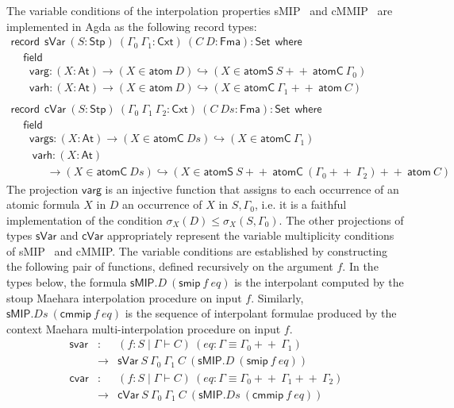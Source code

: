 \documentclass[sn-mathphys-num]{sn-jnl}%
\newcommand{\GG}{\Gamma}
\newcommand{\gs}[1]{\sigma_{X} (#1)}
\newcommand{\sMIP}{\textsf{sMIP}}
\newcommand{\cMMIP}{\textsf{cMMIP}}
\newcommand{\append}{+\!\!+}
\newcommand{\At}{\mathsf{At}}
\newcommand{\Fma}{\mathsf{Fma}}
\newcommand{\where}{\mathsf{where}}
\newcommand{\Set}{\mathsf{Set}}
\newcommand{\record}{\mathsf{record}}
\newcommand{\field}{\mathsf{field}}
\newcommand{\Stp}{\mathsf{Stp}}
\newcommand{\Cxt}{\mathsf{Cxt}}
\theoremstyle{thmstyleone}%
\theoremstyle{thmstyletwo}%
\theoremstyle{thmstylethree}%
\begin{document}
The variable conditions of the interpolation properties \sMIP~ and \cMMIP~ are implemented in Agda as the following record types:
\[
\begin{array}{l}
  \record \:\:  \mathsf{sVar} ~(S : \Stp) ~(\GG_0 ~\GG_1 : \Cxt) ~(C ~D : \Fma) : \Set \:\: \where \\
  \;\;\;\; \field \\
  \;\;\;\; \;\; \mathsf{varg} : (X : \At) \to (X \in \mathsf{atom}~D) \hookrightarrow (X \in \mathsf{atomS} ~S \append ~\mathsf{atomC} ~\Gamma_0) \\
  \;\;\;\; \;\; \mathsf{varh} : (X : \At) \to (X \in \mathsf{atom}~D) \hookrightarrow (X \in \mathsf{atomC} ~\GG_1 \append ~\mathsf{atom} ~C) \\ \\
  \record \:\:  \mathsf{cVar} ~(S : \Stp) ~(\GG_0 ~\GG_1 ~\GG_2: \Cxt) ~(C ~Ds : \Fma) : \Set \:\: \where \\
  \;\;\;\; \field \\
  \;\;\;\; \;\; \mathsf{vargs} : (X : \At) \to (X \in \mathsf{atomC}~Ds) \hookrightarrow (X \in \mathsf{atomC} ~\GG_1)  \\
  \;\;\;\;\; \;\; \mathsf{varh} : (X : \At) \\
  \;\;\;\; \;\; \;\;\;\;\;\,\to (X \in \mathsf{atomC}~Ds) \hookrightarrow (X \in \mathsf{atomS} ~S \append~ \mathsf{atomC} ~(\GG_0 \append~ \GG_2) \append~ \mathsf{atom} ~C)
\end{array}
\]
The projection $\mathsf{varg}$ is an injective function that assigns to each occurrence of an atomic formula $X$ in $D$ an occurrence of $X$ in $S,\Gamma_0$, i.e. it is a faithful implementation of the condition $\gs{D} \leq \gs{S , \GG_0}$. The other projections of types $\mathsf{sVar}$ and $\mathsf{cVar}$ appropriately represent the variable multiplicity conditions of \sMIP~ and \cMMIP.
The variable conditions are established by constructing the following pair of functions, defined recursively on the argument $f$.
In the types below, the formula $\sMIP.D~(\mathsf{smip}~f~eq)$ is the interpolant computed by the stoup Maehara interpolation procedure on input $f$. Similarly, $\sMIP.Ds~(\mathsf{cmmip}~f~eq)$ is the sequence of interpolant formulae produced by the context
Maehara multi-interpolation procedure on input $f$.
\[
\begin{array}{rcl}
\mathsf{svar} & : & (f : S \mid \Gamma \vdash C)
~(eq : \Gamma \equiv \Gamma_0 \append ~\Gamma_1) \\
&\to& \mathsf{sVar} ~S~\Gamma_0~\Gamma_1~C~(\sMIP.D~(\mathsf{smip}~f~eq))
\\[4pt]
\mathsf{cvar} & : & (f : S \mid \Gamma \vdash C)
~(eq : \Gamma \equiv \Gamma_0 \append ~\Gamma_1 \append ~\Gamma_2) \\
& \to&  \mathsf{cVar} ~S~\Gamma_0~\Gamma_1~C~(\sMIP.Ds~(\mathsf{cmmip}~f~eq))
\end{array}
\]
\end{document}
